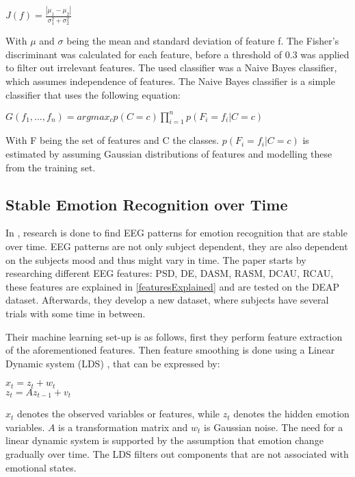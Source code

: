 \begin{center}
$J(f) = \frac{|\mu_1 - \mu_2|}{\sigma_1^2 + \sigma_2^2}$ \
\end{center}

With $\mu$ and $\sigma$ being the mean and standard deviation of feature f. The Fisher's discriminant was calculated for each feature, before a threshold of 0.3 was applied to filter out irrelevant features. The used classifier was a Naive Bayes classifier, which assumes independence of features. The Naive Bayes classifier is a simple classifier that uses the following equation:

\begin{center}
$G(f_1, ..., f_n) = argmax_c p(C=c) \prod\limits_{i=1}^n p(F_i=f_i|C=c)$ \\
\end{center}

With F being the set of features and C the classes. $p(F_i=f_i|C=c)$ is estimated by assuming Gaussian distributions of features and modelling these from the training set.

\subsection{Stable Emotion Recognition over Time}

In \citep{killyPaper}, research is done to find EEG patterns for emotion recognition that are stable over time. EEG patterns are not only subject dependent, they are also dependent on the subjects mood and thus might vary in time. The paper starts by researching different EEG features: PSD, DE, DASM, RASM, DCAU, RCAU, these features are explained in \ref{featuresExplained} and are tested on the DEAP dataset. Afterwards, they develop a new dataset, where subjects have several trials with some time in between.

\npar

Their machine learning set-up is as follows, first they perform feature extraction of the aforementioned features. Then feature smoothing is done using a Linear Dynamic system (LDS) , that can be expressed by:
\begin{center}
$x_t = z_t + w_t$\\
$z_t = Az_{t-1} + v_t$
\end{center}
$x_t$ denotes the observed variables or features, while $z_t$ denotes the hidden emotion variables. $A$ is a transformation matrix and $w_t$ is Gaussian noise. The need for a linear dynamic system is supported by the assumption that emotion change gradually over time. The LDS filters out components that are not associated with emotional states.

